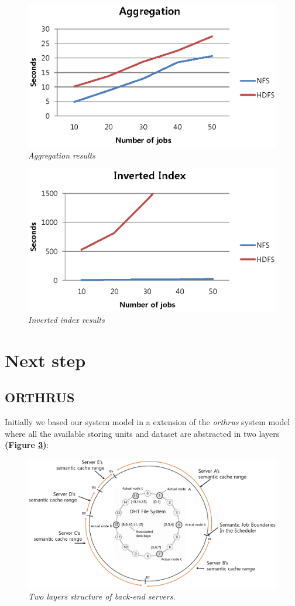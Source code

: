 \documentclass[nocopyrightspace]{sigplanconf}
\begin{document}
\begin{figure}
\centering \includegraphics[width=.50\textwidth]{aggregation.eps}
\caption{\textit{Aggregation results}}
\label{fig:fig3}
\end{figure}


\begin{figure}
\centering \includegraphics[width=.50\textwidth]{inverted_index.eps}
\caption{\textit{Inverted index results}}
\label{fig:fig4}
\end{figure}

\section*{Next step}
\subsection*{ORTHRUS}
Initially we based our system model in a extension of the \textit{orthrus} system model where all the available 
storing units and dataset are abstracted in two layers \textbf{(Figure \ref{fig:fig1})}: 

\begin{figure}
\centering \includegraphics[width=.50\textwidth]{arch.eps}
\caption{\textit{Two layers structure of back-end servers.}}
\label{fig:fig1}
\end{figure}
\end{document}
